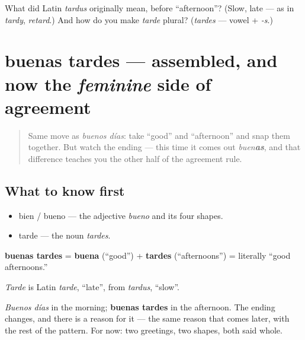 \begin{tcolorbox}[breakable,colback=teal!4,colframe=teal!35!black,title={Before you move on}]
What did Latin \emph{tardus} originally mean, before \textquotedblleft{}afternoon\textquotedblright{}? (Slow, late — as in \emph{tardy}, \emph{retard}.) And how do you make \emph{tarde} plural? (\emph{tardes} — vowel + \emph{-s}.)
\end{tcolorbox}
\section[buenas tardes]{buenas tardes — assembled, and now the \emph{feminine} side of agreement}

\label{lesson:ES-C02-buenas-tardes}



\begin{quote}
Same move as \emph{buenos días}: take \textquotedblleft{}good\textquotedblright{} and \textquotedblleft{}afternoon\textquotedblright{} and snap them together. But watch the ending — this time it comes out \emph{buen\textbf{as}}, and that difference teaches you the other half of the agreement rule.
\end{quote}

\subsection*{What to know first}
\begin{itemize}
\raggedright
  \item bien / bueno — the adjective \emph{bueno} and its four shapes.
  \item tarde — the noun \emph{tardes}.
\end{itemize}

\begin{cousinweb}
\textbf{buenas tardes} = \textbf{buena} (\textquotedblleft{}good\textquotedblright{}) + \textbf{tardes} (\textquotedblleft{}afternoons\textquotedblright{}) = literally \textquotedblleft{}good afternoons.\textquotedblright{}

\emph{Tarde} is Latin \emph{tarde}, \textquotedblleft{}late\textquotedblright{}, from \emph{tardus}, \textquotedblleft{}slow\textquotedblright{}.
\end{cousinweb}

\begin{culture}
\emph{Buenos días} in the morning; \textbf{buenas tardes} in the afternoon. The ending changes, and there is a reason for it — the same reason that comes later, with the rest of the pattern. For now: two greetings, two shapes, both said whole.
\end{culture}

